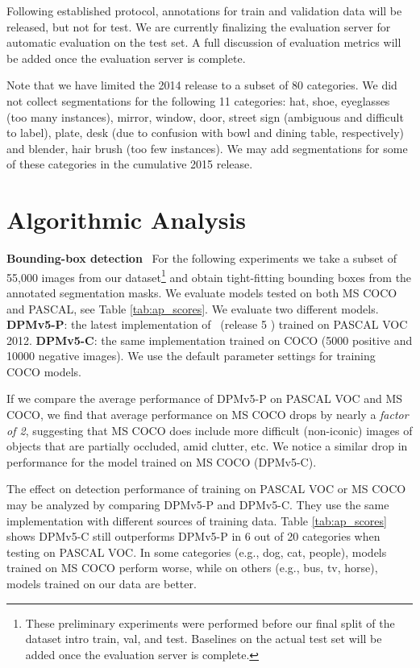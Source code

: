 Following established protocol, annotations for train and validation data will be released, but not for test. We are currently finalizing the evaluation server for automatic evaluation on the test set. A full discussion of evaluation metrics will be added once the evaluation server is complete.

Note that we have limited the 2014 release to a subset of 80 categories. We did not collect segmentations for the following 11 categories: hat, shoe, eyeglasses (too many instances), mirror, window, door, street sign (ambiguous and difficult to label), plate, desk (due to confusion with bowl and dining table, respectively) and blender, hair brush (too few instances). We may add segmentations for some of these categories in the cumulative 2015 release.

\section{Algorithmic Analysis}

\textbf{Bounding-box detection}~ For the following experiments we take a subset of 55,000 images from our dataset\footnote{These preliminary experiments were performed before our final split of the dataset intro train, val, and test. Baselines on the actual test set will be added once the evaluation server is complete.} and obtain tight-fitting bounding boxes from the annotated segmentation masks. We evaluate models tested on both MS COCO and PASCAL, see Table \ref{tab:ap_scores}. We evaluate two different models. \textbf{DPMv5-P}: the latest implementation of~\cite{felzenszwalb2010object} (release 5 \cite{voc-release5}) trained on PASCAL VOC 2012. \textbf{DPMv5-C}: the same implementation trained on COCO (5000 positive and 10000 negative images).  We use the default parameter settings for training COCO models.

If we compare the average performance of DPMv5-P on PASCAL VOC and MS COCO, we find that average performance on MS COCO drops by nearly a {\em factor of 2}, suggesting that MS COCO does include more difficult (non-iconic) images of objects that are partially occluded, amid clutter, etc. We notice a similar drop in performance for the model trained on MS COCO (DPMv5-C).

The effect on detection performance of training on PASCAL VOC or MS COCO may be analyzed by comparing DPMv5-P and DPMv5-C. They use the same implementation with different sources of training data. Table \ref{tab:ap_scores} shows DPMv5-C still outperforms DPMv5-P in 6 out of 20 categories when testing on PASCAL VOC. In some categories (e.g., dog, cat, people), models trained on MS COCO perform worse, while on others (e.g., bus, tv, horse), models trained on our data are better.


